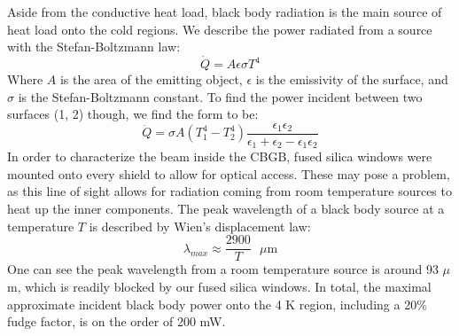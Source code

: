 Aside from the conductive heat load, black body radiation is the main source of heat load onto the cold regions. We describe the power radiated from a source with the Stefan-Boltzmann law:
\begin{equation}
	\dot{Q} = A \epsilon \sigma T^4
\end{equation}
Where $A$ is the area of the emitting object, $\epsilon$ is the emissivity of the surface, and $\sigma$ is the Stefan-Boltzmann constant. To find the power incident between two surfaces (1, 2) though, we find the form to be:
\begin{equation}
	\dot{Q} = \sigma A (T_1^4 - T_2^4)\frac{\epsilon_1 \epsilon_2}{\epsilon_1 + \epsilon_2 - \epsilon_1 \epsilon_2}
\end{equation}
In order to characterize the beam inside the CBGB, fused silica windows were mounted onto every shield to allow for optical access. These may pose a problem, as this line of sight allows for radiation coming from room temperature sources to heat up the inner components. The peak wavelength of a black body source at a temperature $T$ is described by Wien's displacement law:
\begin{equation}
	\lambda_{max} \approx \frac{2900}{T}\text{ $\mu$m}
	\label{eq: BBR peak lambda}
\end{equation}
One can see the peak wavelength from a room temperature source is around 93 $\mu$m, which is readily blocked by our fused silica windows. In total, the maximal approximate incident black body power onto the 4 K region, including a 20\% fudge factor, is on the order of 200 mW.
